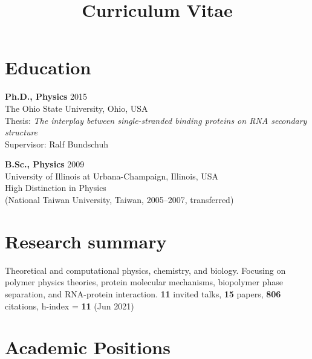 \documentclass[11pt]{../yhlcv}
\begin{document}
\title{Curriculum Vitae}

\maketitle

\raggedright

\section*{Education}

{\bf Ph.D., Physics} \hfill 2015 \vspace{0.25em}\\
The Ohio State University, Ohio, USA \\
Thesis: {\it  The interplay between single-stranded binding proteins on RNA secondary structure} \\
Supervisor: Ralf Bundschuh

{\bf B.Sc., Physics} \hfill 2009 \vspace{0.25em}\\
University of Illinois at Urbana-Champaign, Illinois, USA \\
High Distinction in Physics \\
{\small (National Taiwan University, Taiwan, 2005--2007, transferred)}

\section*{Research summary}

Theoretical and computational physics, chemistry, and biology. Focusing on polymer physics theories, protein molecular mechanisms, biopolymer phase separation, and RNA-protein interaction. 
{\bf 11} invited talks, {\bf 15} papers, {\bf 806} citations, h-index = {\bf 11} (Jun 2021)

\section*{Academic Positions}
\end{document}
